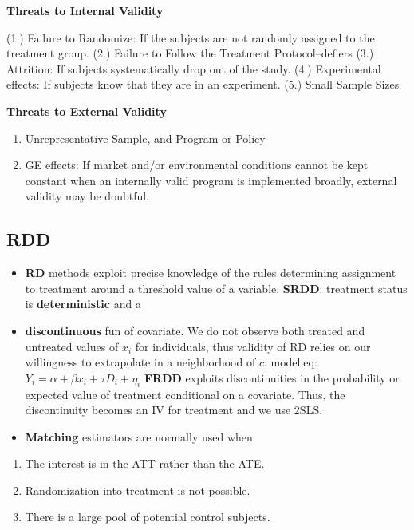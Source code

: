 \documentclass[
]{article}
\providecommand{\tightlist}{%
  \setlength{\itemsep}{0pt}\setlength{\parskip}{0pt}}
\begin{document}
\textbf{Threats to Internal Validity}

(1.) Failure to Randomize: If the subjects are not randomly assigned to
the treatment group. (2.) Failure to Follow the Treatment
Protocol--defiers (3.) Attrition: If subjects systematically drop out of
the study. (4.) Experimental effects: If subjects know that they are in
an experiment. (5.) Small Sample Sizes

\textbf{Threats to External Validity}

\begin{enumerate}
\def\labelenumi{(\arabic{enumi})}
\item
  Unrepresentative Sample, and Program or Policy
\item
  GE effects: If market and/or environmental conditions cannot be kept
  constant when an internally valid program is implemented broadly,
  external validity may be doubtful.
\end{enumerate}

\hypertarget{rdd}{%
\subsection{RDD}\label{rdd}}

\begin{itemize}
\item
  \textbf{RD} methods exploit precise knowledge of the rules determining
  assignment to treatment around a threshold value of a variable.
  \textbf{SRDD}: treatment status is \textbf{deterministic} and a
\item
  \textbf{discontinuous} fun of covariate. We do not observe both
  treated and untreated values of \(x_{i}\) for individuals, thus
  validity of \(\mathrm{RD}\) relies on our willingness to extrapolate
  in a neighborhood of \(c\). model.eq:
  \(Y_{i}=\alpha+\beta x_{i}+\tau D_{i}+\eta_{i}\) \textbf{FRDD}
  exploits discontinuities in the probability or expected value of
  treatment conditional on a covariate. Thus, the discontinuity becomes
  an IV for treatment and we use 2SLS.
\end{itemize}

\begin{itemize}
\tightlist
\item
  \textbf{Matching} estimators are normally used when
\end{itemize}

\begin{enumerate}
\def\labelenumi{\arabic{enumi}.}
\item
  The interest is in the ATT rather than the ATE.
\item
  Randomization into treatment is not possible.
\item
  There is a large pool of potential control subjects.
\end{enumerate}
\end{document}
